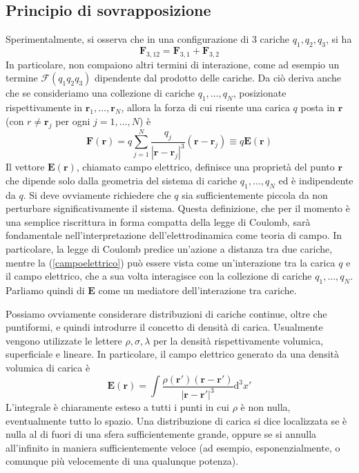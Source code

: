\documentclass[a4paper,11pt]{book}
\newcommand{\dif}{\mathrm{d}}
\renewcommand{\vec}[1]{\mathbf{#1}}
\theoremstyle{theorem}
\theoremstyle{definition}
\begin{document}
\subsection{Principio di sovrapposizione}
Sperimentalmente, si osserva che in una configurazione di 3 cariche $q_1,q_2,q_3$, si ha
\[
\vec{F}_{3,12}=\vec{F}_{3,1}+\vec{F}_{3,2}
\]
In particolare, non compaiono altri termini di interazione, come ad esempio un termine $\vec{\mathcal F}(q_1q_2q_3)$ dipendente dal prodotto delle cariche. Da ciò deriva anche che se consideriamo una collezione di cariche $q_1,\dots,q_N$, posizionate rispettivamente in $\vec{r}_1,\dots,\vec{r}_N$, allora la forza di cui risente una carica $q$ posta in $\vec{r}$ (con $r\neq\vec{r}_j$ per ogni $j=1,\dots,N$) è
\begin{equation}
\label{campoelettrico}
\vec{F}(\vec{r})=q\sum_{j=1}^{N}\frac{q_j}{|\vec{r}-\vec{r}_j|^3}\left(\vec{r}-\vec{r}_j\right)\equiv q\vec{E}(\vec{r})
\end{equation}
Il vettore $\vec{E}(\vec{r})$, chiamato campo elettrico, definisce una proprietà del punto $\vec{r}$ che dipende solo dalla geometria del sistema di cariche $q_1,\dots,q_N$ ed è indipendente da $q$. Si deve ovviamente richiedere che $q$ sia sufficientemente piccola da non perturbare significativamente il sistema. Questa definizione, che per il momento è una semplice riscrittura in forma compatta della legge di Coulomb, sarà fondamentale nell'interpretazione dell'elettrodinamica come teoria di campo. In particolare, la legge di Coulomb predice un'azione a distanza tra due cariche, mentre la (\ref{campoelettrico}) può essere vista come un'interazione tra la carica $q$ e il campo elettrico, che a sua volta interagisce con la collezione di cariche $q_1,\dots,q_N$. Parliamo quindi di $\vec{E}$ come un mediatore dell'interazione tra cariche.

Possiamo ovviamente considerare distribuzioni di cariche continue, oltre che puntiformi, e quindi introdurre il concetto di densità di carica. Usualmente vengono utilizzate le lettere $\rho,\sigma,\lambda$ per la densità rispettivamente volumica, superficiale e lineare. In particolare, il campo elettrico generato da una densità volumica di carica è
\[\vec{E}(\vec{r})=\int\frac{\rho(\vec{r}')\left(\vec{r}-\vec{r}'\right)}{\left|\vec{r}-\vec{r}'\right|^3}\dif^3x'\]
L'integrale è chiaramente esteso a tutti i punti in cui $\rho$ è non nulla, eventualmente tutto lo spazio. Una distribuzione di carica si dice localizzata se è nulla al di fuori di una sfera sufficientemente grande, oppure se si annulla all'infinito in maniera sufficientemente veloce (ad esempio, esponenzialmente, o comunque più velocemente di una qualunque potenza).
\end{document}
